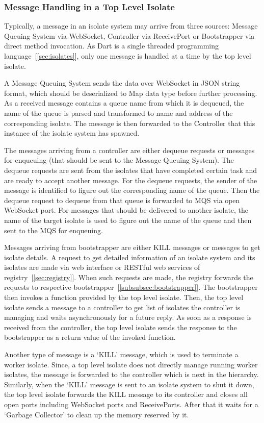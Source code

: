   \subsubsection{Message Handling in a Top Level Isolate}
  Typically, a message in an isolate system may arrive from three sources: Message Queuing System via WebSocket, Controller via ReceivePort or Bootstrapper via direct method invocation. As Dart is a single threaded programming language~[\autoref{sec:isolates}], only one message is handled at a time by the top level isolate.

  A Message Queuing System sends the data over WebSocket in JSON string format, which should be deserialized to Map data type before further processing. As a received message contains a queue name from which it is dequeued, the name of the queue is parsed and transformed to name and address of the corresponding isolate. The message is then forwarded to the Controller that this instance of the isolate system has spawned.

  The messages arriving from a controller are either dequeue requests or messages for enqueuing (that should be sent to the Message Queuing System). The dequeue requests are sent from the isolates that have completed certain task and are ready to accept another message. For the dequeue requests, the sender of the message is identified to figure out the corresponding name of the queue. Then the dequeue request to dequeue from that queue is forwarded to MQS via open WebSocket port. For messages that should be delivered to another isolate, the name of the target isolate is used to figure out the name of the queue and then sent to the MQS for enqueuing.

Messages arriving from bootstrapper are either KILL messages or messages to get isolate details. A request to get detailed information of an isolate system and its isolates are made via web interface or RESTful web services of registry~[\autoref{sec:registry}]. When such requests are made, the registry forwards the requests to respective bootstrapper~[\autoref{subsubsec:bootstrapper}]. The bootstrapper then invokes a function provided by the top level isolate. Then, the top level isolate sends a message to a controller to get list of isolates the controller is managing and waits asynchronously for a future reply. As soon as a response is received from the controller, the top level isolate sends the response to the bootstrapper as a return value of the invoked function.

  Another type of message is a ‘KILL’ message, which is used to terminate a worker isolate. Since, a top level isolate does not directly manage running worker isolates, the message is forwarded to the controller which is next in the hierarchy. Similarly, when the ‘KILL’ message is sent to an isolate system to shut it down, the top level isolate forwards the KILL message to its controller and closes all open ports including WebSocket ports and ReceivePorts. After that it waits for a ‘Garbage Collector’ to clean up the memory reserved by it.

